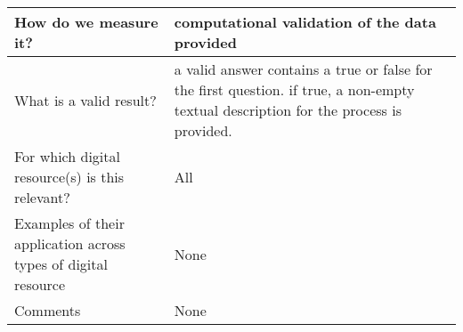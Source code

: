\documentclass[english]{article}
\begin{document}
\begin{longtable}{|p{5cm}|p{9cm}|}
\\



\hline
How do we measure it? &  


computational validation of the data provided




\\



\hline
What is a valid result? &  



a valid answer contains a true or false for the first question. if true, a non-empty textual description for the process is provided.


\\



\hline
For which digital resource(s) is this relevant? &  All\\



\hline
Examples of their application across types of digital resource &  None

\\



\hline

Comments & None 

\\
\hline

\end{longtable}


\newpage
\end{document}
